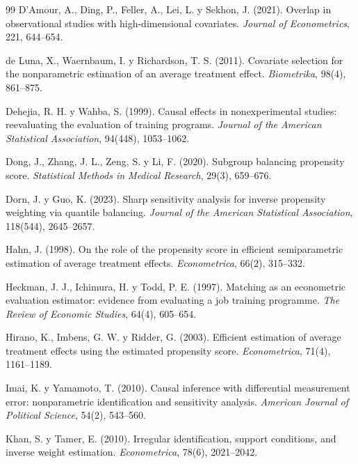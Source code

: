 \begin{thebibliography}{99}
 D'Amour, A., Ding, P., Feller, A., Lei, L. y Sekhon, J. (2021). Overlap in observational studies with high-dimensional covariates. \emph{Journal of Econometrics}, 221, 644--654.

 de Luna, X., Waernbaum, I. y Richardson, T. S. (2011). Covariate selection for the nonparametric estimation of an average treatment effect. \emph{Biometrika}, 98(4), 861--875.

 Dehejia, R. H. y Wahba, S. (1999). Causal effects in nonexperimental studies: reevaluating the evaluation of training programs. \emph{Journal of the American Statistical Association}, 94(448), 1053--1062.

 Dong, J., Zhang, J. L., Zeng, S. y Li, F. (2020). Subgroup balancing propensity score. \emph{Statistical Methods in Medical Research}, 29(3), 659--676.

 Dorn, J. y Guo, K. (2023). Sharp sensitivity analysis for inverse propensity weighting via quantile balancing. \emph{Journal of the American Statistical Association}, 118(544), 2645--2657.

 Hahn, J. (1998). On the role of the propensity score in efficient semiparametric estimation of average treatment effects. \emph{Econometrica}, 66(2), 315--332.

 Heckman, J. J., Ichimura, H. y Todd, P. E. (1997). Matching as an econometric evaluation estimator: evidence from evaluating a job training programme. \emph{The Review of Economic Studies}, 64(4), 605--654.

 Hirano, K., Imbens, G. W. y Ridder, G. (2003). Efficient estimation of average treatment effects using the estimated propensity score. \emph{Econometrica}, 71(4), 1161--1189.

 Imai, K. y Yamamoto, T. (2010). Causal inference with differential measurement error: nonparametric identification and sensitivity analysis. \emph{American Journal of Political Science}, 54(2), 543--560.

 Khan, S. y Tamer, E. (2010). Irregular identification, support conditions, and inverse weight estimation. \emph{Econometrica}, 78(6), 2021--2042.


\end{thebibliography}
